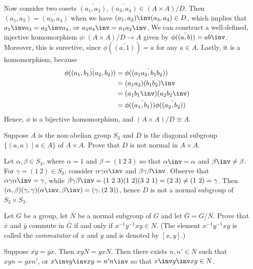 \begin{problems}
\begin{sol}
        Now consider two cosets $\bar{(a_1, a_2)}, \bar{(a_3, a_4)} \in (A \times A)/D$. Then $\bar{(a_1, a_2)} = \bar{(a_3, a_4)}$ when we have $(a_1, a_2)\inv(a_3, a_4) \in D$, which implies that $a_1\inv a_3 = a_2\inv a_4$, or $a_3a_4\inv = a_1a_2\inv$. We can construct a well-defined, injective homomorphism $\phi : (A \times A)/D \to A$ given by $\phi(\bar{(a, b)}) = ab\inv$. Moreover, this is surective, since $\phi(\bar{(a, 1)}) = a$ for any $a \in A$. Lastly, it is a homomorphism, because
        \begin{align*}
            \phi(\bar{(a_1, b_1)(a_2, b_2)}) & = \phi(\bar{(a_1a_2, b_1b_2)}) \\
            & = (a_1a_2)(b_1b_2)\inv \\
            & = (a_1b_1\inv)(a_2b_2\inv) \\
            & = \phi(\bar{(a_1, b_1)})\phi(\bar{(a_2, b_2)})
        \end{align*}
        Hence, $\phi$ is a bijective homomorphism, and $(A \times A)/D \cong A$.
    \end{sol}
    \item Suppose $A$ is the non-abelian group $S_3$ and $D$ is the diagonal subgroup $\{(a,a) \mid a \in A\}$ of $A \times A$. Prove that $D$ is not normal in $A \times A$.
    \begin{sol}
        Let $\alpha, \beta \in S_3$, where $\alpha = 1$ and $\beta = (1\ 2\ 3)$ so that $\alpha\inv = \alpha$ and $\beta\inv \neq \beta$. For $\gamma = (1\ 2) \in S_3$, consider $\alpha\gamma\alpha\inv$ and $\beta\gamma\beta\inv$. Observe that $\alpha\gamma\alpha\inv = \gamma$, while $\beta\gamma\beta\inv = (1\ 2\ 3)(1\ 2)(3\ 2\ 1) = (2\ 3) \neq (1\ 2) = \gamma$. Then $(\alpha, \beta)(\gamma, \gamma)(\alpha\inv, \beta\inv) = (\gamma, (2\ 3))$, hence $D$ is not a normal subgroup of $S_3 \times S_3$.
    \end{sol}
    \item \label{ex3.1.40}Let $G$ be a group, let $N$ be a normal subgroup of $G$ and let $\bar{G} = G/N$. Prove that $\bar{x}$ and $\bar{y}$ commute in $\bar{G}$ if and only if $x^{-1}y^{-1}xy \in N$. (The element $x^{-1}y^{-1}xy$ is called the \textit{commutator} of $x$ and $y$ and is denoted by $[x,y]$.)
    \begin{sol}
        \rightimp Suppose $\bar{xy} = \bar{yx}$. Then $xyN = yxN$. Then there exists $n, n' \in N$ such that $xyn = yxn'$, or $x\inv y\inv xy = n'n\inv$ so that $x\inv y\inv xy \in N$.


\end{sol}
\end{problems}
